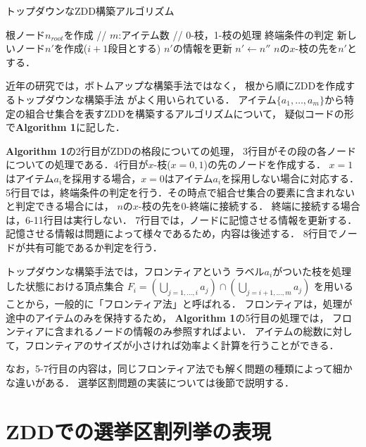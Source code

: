 \begin{algorithm}
  \caption{トップダウンなZDD構築アルゴリズム}
  \label{zdd_topdown}
  \begin{algorithmic}[1]
    \State 根ノード$n_{root}$を作成
     // $m$:アイテム数
       // 0-枝，1-枝の処理
        \State 終端条件の判定
        \State 新しいノード$n'$を作成($i+1$段目とする)
        \State $n'$の情報を更新
          \State $n' \gets n''$
        \EndIf
        \State $n$の$x$-枝の先を$n'$とする．
        \EndFor
      \EndFor
    \EndFor
  \end{algorithmic}
\end{algorithm}

近年の研究では，ボトムアップな構築手法ではなく，
根から順にZDDを作成するトップダウンな構築手法\cite{minato_or}\cite{sekine}
がよく用いられている．
アイテム$\{a_1,\ldots	,a_m\}$から特定の組合せ集合を表すZDDを構築するアルゴリズムについて，
疑似コードの形で\textbf{Algorithm 1}に記した．

\textbf{Algorithm 1}の2行目がZDDの格段についての処理，
3行目がその段の各ノードについての処理である．4行目が$x$-枝($x=0,1$)の先のノードを作成する．
$x=1$はアイテム$a_i$を採用する場合，$x=0$はアイテム$a_i$を採用しない場合に対応する．
5行目では，終端条件の判定を行う．その時点で組合せ集合の要素に含まれないと判定できる場合には，
$n$の$x$-枝の先を0-終端に接続する．
終端に接続する場合は，6-11行目は実行しない．
7行目では，ノードに記憶させる情報を更新する．
記憶させる情報は問題によって様々であるため，内容は後述する．
8行目でノードが共有可能であるか判定を行う．

トップダウンな構築手法では，フロンティアという
ラベル$a_i$がついた枝を処理した状態における頂点集合
$F_i=(\bigcup_{j=1,\ldots ,i}a_j)\cap (\bigcup_{j=i+1, \ldots, m} a_j)$
を用いることから，一般的に「フロンティア法」と呼ばれる．
フロンティアは，処理が途中のアイテムのみを保持するため，
\textbf{Algorithm 1}の5行目の処理では，
フロンティアに含まれるノードの情報のみ参照すればよい．
アイテムの総数に対して，フロンティアのサイズが小さければ効率よく計算を行うことができる．

なお，5-7行目の内容は，同じフロンティア法でも解く問題の種類によって細かな違いがある．
選挙区割問題の実装については後節で説明する．

\section{ZDDでの選挙区割列挙の表現}


